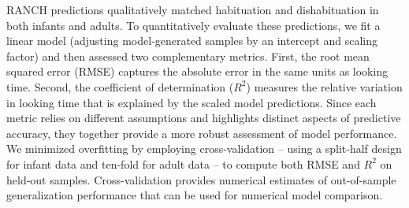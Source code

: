 \documentclass[
]{article}
\begin{document}
RANCH predictions qualitatively matched habituation and dishabituation in both infants and adults. To quantitatively evaluate these predictions, we fit a linear model (adjusting model‐generated samples by an intercept and scaling factor) and then assessed two complementary metrics. First, the root mean squared error (RMSE) captures the absolute error in the same units as looking time. Second, the coefficient of determination ($R^2$) measures the relative variation in looking time that is explained by the scaled model predictions. Since each metric relies on different assumptions and highlights distinct aspects of predictive accuracy, they together provide a more robust assessment of model performance. We minimized overfitting by employing cross‐validation -- using a split‐half design for infant data and ten‐fold for adult data -- to compute both RMSE and $R^2$ on held‐out samples. Cross-validation provides numerical estimates of out-of-sample generalization performance that can be used for numerical model comparison. 

\begin{table}
\centering
\caption{Cross-validated RMSE across linking hypotheses and lesioned models. Mean RMSE and $R^2$ is averaged across all parameter values, best RMSE and $R^2$ is the single best-performing parameter set.}
\end{table}
\end{document}
